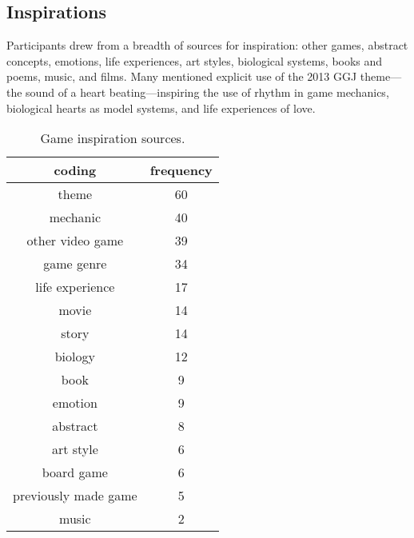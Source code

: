 \documentclass{sig-alternate}
\begin{document}

\subsection{Inspirations}
Participants drew from a breadth of sources for inspiration: other games, abstract concepts, emotions, life experiences, art styles, biological systems, books and poems, music, and films. Many mentioned explicit use of the 2013 GGJ theme---the sound of a heart beating---inspiring the use of rhythm in game mechanics, biological hearts as model systems, and life experiences of love. 

\begin{table}[tb]
\centering
\scriptsize
\begin{tabular}{|c|c|}
\hline coding & frequency \\ 
\hline theme & 60 \\ 
\hline mechanic & 40 \\ 
\hline other video game & 39 \\ 
\hline game genre & 34 \\ 
\hline life experience & 17 \\ 
\hline movie & 14 \\ 
\hline story & 14 \\ 
\hline biology & 12 \\ 
\hline book & 9 \\ 
\hline emotion & 9 \\ 
\hline abstract & 8 \\ 
\hline art style & 6 \\ 
\hline board game & 6 \\ 
\hline previously made game & 5 \\ 
\hline music & 2 \\ 
\hline 
\end{tabular}
\caption{Game inspiration sources.}
\label{tab:inspiration}
\end{table}
\end{document}
